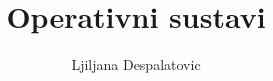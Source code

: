 \usepackage{verbatim}
\usepackage{todonotes}

\usepackage{bitset}

\setlength{\parskip}{6pt} %

\newcommand{\ld}[1]{\textcolor[rgb]{1.00,0.50,0.00}
{\noindent\ensuremath{\langle}\textit{napomena: #1}\ensuremath{\rangle}}}
\newcommand{\bb}[1]{\textcolor[rgb]{1.00,0.00,0.00}
{\noindent\ensuremath{\langle}\textit{ljiljana: #1}\ensuremath{\rangle}}}

\author{Ljiljana Despalatovic}
\title{Operativni sustavi}
